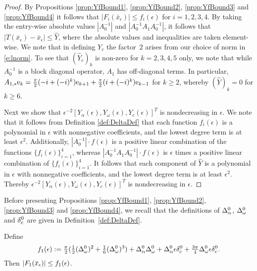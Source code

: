 \begin{proof}
	By Propositions \ref{prop:YfBound1}, \ref{prop:YfBound2},  \ref{prop:YfBound3} and  \ref{prop:YfBound4} it follows that $|F_i(\bar{x}_\epsilon)| \leq f_i(\epsilon)$ for $i=1,2,3,4$. 
	By taking the entry-wise absolute values $ \left| A_0^{-1}  \right|   $  and $\left| A_0^{-1} A_1  A_0^{-1}   \right| $, it follows that $ |T(\bar{x}_\epsilon ) - \bar{x}_\epsilon| \leq \hat{Y}$, where the absolute values and inequalities are taken element-wise. 
We note that  in defining $ Y_c$ the factor~$2$ arises from our choice of norm in \eqref{e:lnorm}. 
	To see that  $(\hat{Y}_c)_k$ is non-zero for $k = 2,3,4,5$ only, we note that while $A_0^{-1}$ is a block diagonal operator, $A_1$  has off-diagonal terms. In particular, $ A_{1,*} \mathrm{e}_k = \tfrac{\pi}{2} (-i+(-i)^k) \mathrm{e}_{k+1} + \tfrac{\pi}{2} (i+(-i)^k) \mathrm{e}_{k-1}$ for $k \geq 2$, whereby  $( \hat{Y})_k =0$ for $ k \geq 6$. 


Next we show that  $\epsilon^{-2} [ Y_\alpha(\epsilon), Y_\omega(\epsilon), Y_c(\epsilon)]^T$ is nondecreasing in $\epsilon$. We note that it follows from Definition \ref{def:DeltaDef} that each function $f_i(\epsilon)$ is a polynomial in $\epsilon$ with nonnegative coefficients, and the lowest degree term is at least $ \epsilon^2$. 
Additionally, $\left| A_0^{-1}  \right| \cdot  f(\epsilon)   $  is a positive linear combination of the functions $\{f_i(\epsilon)\}_{i=1}^4$, 
whereas $\left| A_0^{-1} A_1  A_0^{-1}   \right|    \cdot  f(\epsilon)  $ is $ \epsilon$ times a positive linear combination of  $\{f_i(\epsilon)\}_{i=1}^4$. 
It follows that each component of  $\hat{Y}$  is a polynomial in $\epsilon$ with nonnegative coefficients, and the lowest degree term is at least $ \epsilon^2$. 
	Thereby $\epsilon^{-2} [ Y_\alpha(\epsilon),Y_\omega(\epsilon),Y_c(\epsilon)]^T$ is nondecreasing in $\epsilon$. 
	

	

\end{proof}
Before presenting Propositions \ref{prop:YfBound1}, \ref{prop:YfBound2},  \ref{prop:YfBound3} and  \ref{prop:YfBound4}, 
we recall that the definitions of $\Delta_\alpha^0$, $\Delta_\omega^0$ and $\delta_c^0$ are given  in  Definition~\ref{def:DeltaDef}. 
\begin{proposition}
	\label{prop:YfBound1}
Define 
\begin{equation}\label{e:f1}
f_1 (\epsilon) := \tfrac{\pi}{2} ( \tfrac{1}{2} (\Delta_\omega^0)^2 + \tfrac{1}{6} (\Delta_\omega^0)^3) + \Delta_\alpha^0 \Delta_\omega^0 +  \Delta_\alpha^0 \epsilon \delta_c^0 + \tfrac{3\pi   }{4} \Delta_\omega^0 \epsilon \delta_c^0 .
\end{equation}
	Then $| F_1(\bar{x}_\epsilon) | \leq  f_1(\epsilon)$. 
\end{proposition}
